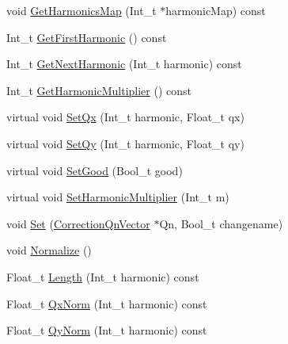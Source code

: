 \begin{DoxyCompactItemize}
\item 
void \mbox{\hyperlink{classQn_1_1CorrectionQnVector_af41ace21d8328373d0496ea68e5a468c}{Get\+Harmonics\+Map}} (Int\+\_\+t $\ast$harmonic\+Map) const
\item 
Int\+\_\+t \mbox{\hyperlink{classQn_1_1CorrectionQnVector_ac5110bb9d339c2387e0cfd411c534997}{Get\+First\+Harmonic}} () const
\item 
Int\+\_\+t \mbox{\hyperlink{classQn_1_1CorrectionQnVector_a9b0c28b62017cc7a369b39bbbbc2301a}{Get\+Next\+Harmonic}} (Int\+\_\+t harmonic) const
\item 
Int\+\_\+t \mbox{\hyperlink{classQn_1_1CorrectionQnVector_a083f96d5886c8ea53681a125043e8150}{Get\+Harmonic\+Multiplier}} () const
\item 
virtual void \mbox{\hyperlink{classQn_1_1CorrectionQnVector_a6de477e3cecce7c5f5b9212ecbafea59}{Set\+Qx}} (Int\+\_\+t harmonic, Float\+\_\+t qx)
\item 
virtual void \mbox{\hyperlink{classQn_1_1CorrectionQnVector_af0ac581e943fe88b0a94838c670f2c4d}{Set\+Qy}} (Int\+\_\+t harmonic, Float\+\_\+t qy)
\item 
virtual void \mbox{\hyperlink{classQn_1_1CorrectionQnVector_a71b91d6c9ed672d997f91421192974f6}{Set\+Good}} (Bool\+\_\+t good)
\item 
virtual void \mbox{\hyperlink{classQn_1_1CorrectionQnVector_acc6c39c8247f6f43c13c1886c3a5bcd4}{Set\+Harmonic\+Multiplier}} (Int\+\_\+t m)
\item 
void \mbox{\hyperlink{classQn_1_1CorrectionQnVector_acd45aaacfb58f260eb8b0102cc46ef05}{Set}} (\mbox{\hyperlink{classQn_1_1CorrectionQnVector}{Correction\+Qn\+Vector}} $\ast$Qn, Bool\+\_\+t changename)
\item 
void \mbox{\hyperlink{classQn_1_1CorrectionQnVector_a8e2e40587de98b65ec6b89ce82fb63a7}{Normalize}} ()
\item 
Float\+\_\+t \mbox{\hyperlink{classQn_1_1CorrectionQnVector_ad8b5dd08034a692eee13f2baa4d42269}{Length}} (Int\+\_\+t harmonic) const
\item 
Float\+\_\+t \mbox{\hyperlink{classQn_1_1CorrectionQnVector_abf503da4fb27fc1e046fbd195a841926}{Qx\+Norm}} (Int\+\_\+t harmonic) const
\item 
Float\+\_\+t \mbox{\hyperlink{classQn_1_1CorrectionQnVector_af8c17655a61268b003515554cc146814}{Qy\+Norm}} (Int\+\_\+t harmonic) const
\item 
\mbox{\label{classQn_1_1CorrectionQnVector_ab157bf86ea39a70bba7f3fd1534d0166}} 

\end{DoxyCompactItemize}
